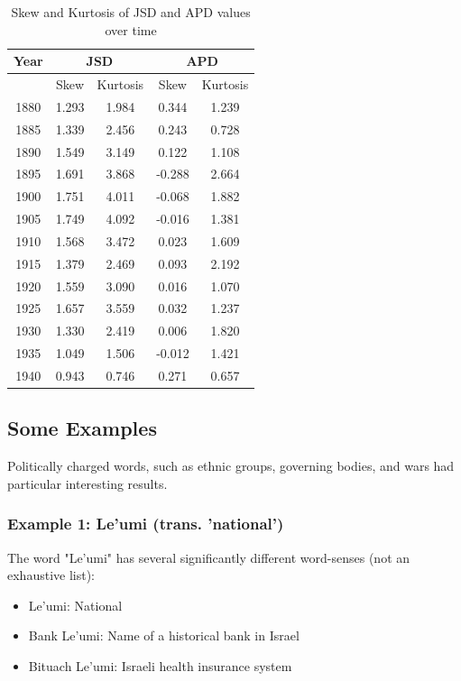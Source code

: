 \documentclass[10pt, a4paper]{article}
\begin{document}
\begin{table}[!h]
\label{SkewKurtosis_JSDandAPD}
\begin{center}
\begin{tabularx}{\columnwidth}{|c|c|c|c|c|}

      \hline
      Year&\multicolumn{2}{c}{JSD}&\multicolumn{2}{c}{APD}\\
      \hline
      &Skew&Kurtosis&Skew&Kurtosis \\
      \hline
      1880&1.293&1.984&0.344&1.239\\
      \hline
      1885&1.339&2.456&0.243&0.728\\
      \hline
      1890&1.549&3.149&0.122&1.108\\
      \hline
      1895&1.691&3.868&-0.288&2.664\\
      \hline
      1900&1.751&4.011&-0.068&1.882\\
      \hline
      1905&1.749&4.092&-0.016&1.381\\
      \hline
      1910&1.568&3.472&0.023&1.609\\
      \hline
      1915&1.379&2.469&0.093&2.192\\
      \hline
      1920&1.559&3.090&0.016&1.070\\
      \hline
      1925&1.657&3.559&0.032&1.237\\
      \hline
      1930&1.330&2.419&0.006&1.820\\
      \hline
      1935&1.049&1.506&-0.012&1.421\\
      \hline
      1940&0.943&0.746&0.271&0.657\\
      \hline

\end{tabularx}
\caption{Skew and Kurtosis of JSD and APD values over time}
 \end{center}
\end{table}

\subsection{Some Examples}
Politically charged words, such as ethnic groups, governing bodies, and wars had particular interesting results. 
\subsubsection{Example 1: Le'umi (trans. 'national')}
The word "Le'umi" has several significantly different word-senses (not an exhaustive list):  
\begin{itemize}
    \item Le'umi: National
    \item Bank Le'umi: Name of a historical bank in Israel
    \item Bituach Le'umi: Israeli health insurance system
\end{itemize}
\end{document}
